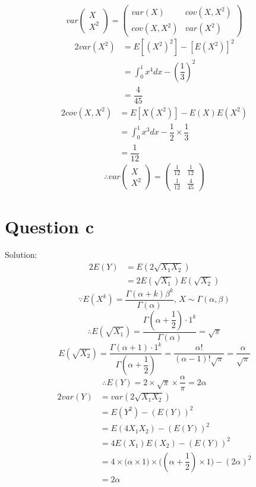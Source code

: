 \documentclass[a4papers]{ctexart}
\begin{document}
\[ var\begin{pmatrix}X \\ X^2 \end{pmatrix} 
    =\begin{pmatrix} var(X) & cov(X,X^2) \\ cov(X,X^2) & var(X^2) \end{pmatrix}\]        
\begin{alignat*}{2}
    var(X^2) &= E[(X^2)^2]-[E(X^2)]^2 \\
    &= \int_0^1 x^4 dx -\left( \dfrac{1}{3} \right)^2\\
    &= \dfrac{4}{45}
\end{alignat*}
\begin{alignat*}{2}
    cov(X,X^2) &= E[X(X^2)]-E(X)E(X^2)\\
    &=\int_0^1 x^3 dx -\dfrac{1}{2}\times\dfrac{1}{3}\\
    &=\dfrac{1}{12}
\end{alignat*}
\[
    \therefore   var\begin{pmatrix}X \\ X^2 \end{pmatrix} = \begin{pmatrix}\frac{1}{12} & \frac{1}{12} \\ \frac{1}{12} & \frac{4}{45}  \end{pmatrix}
\]

\section*{Question c}
\noindent Solution:
\begin{alignat*}{2}
   E(Y) &= E(2\sqrt{X_1 X_2})\\
        &= 2E(\sqrt{X_1})E(\sqrt{X_2})
\end{alignat*}
\[\because E\left( X^{k}\right) =\dfrac {\Gamma \left( \alpha +k\right) \beta ^{k}}{\Gamma \left( \alpha \right) },\, X\sim \Gamma(\alpha,\beta)\]
\[\therefore E\left(\sqrt{{X_1}}\right) =\dfrac {\Gamma \left( \alpha +\dfrac{1}{2}\right)\cdot 1 ^{k}}{\Gamma \left( \alpha \right) } = \sqrt{\pi}\]
\[ E\left(\sqrt{{X_2}}\right) =\dfrac {\Gamma \left( \alpha + 1 \right) \cdot 1 ^{k}}{\Gamma \left( \alpha + \dfrac{1}{2}\right) } 
= \dfrac{\alpha! }{(\alpha-1)! \sqrt{\pi}}
= \dfrac{\alpha}{\sqrt{\pi}}\]
\[\therefore E(Y) = 2\times\sqrt{\pi}\times\dfrac{\alpha}{\pi}=2\alpha\]
\begin{alignat*}{2}
    var(Y)&=var(2\sqrt{X_1 X_2})\\
          &=E(Y^2)-\left(E(Y)\right)^2\\
          &=E(4X_1 X_2)-\left(E(Y)\right)^2\\
          &=4E(X_1)E(X_2)-\left(E(Y)\right)^2\\
          &=4\times\Big(\alpha\times 1\Big)\times\Big((\alpha+\dfrac{1}{2})\times 1\Big)-(2\alpha)^2\\
          &=2\alpha
\end{alignat*}
\end{document}
